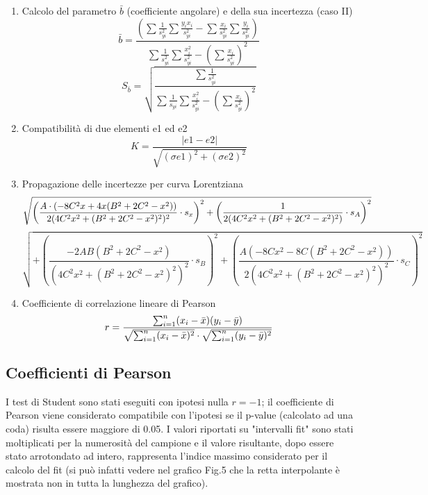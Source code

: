 \documentclass{article}
\begin{document}
\begin{enumerate}
\[
s_{\hat{a}} = s_y \sqrt{ \frac{ \sum_i x_i^2 }{ \Delta } }
\quad\quad
s_{\hat{b}} = s_y \sqrt{ \frac{N}{\Delta} }
\]
\item Calcolo del parametro $\bar{b}$ (coefficiente angolare) e della sua incertezza (caso II)
\[
\bar{b} = \frac{\left(\sum \frac{1}{s_{yi}^2} \sum \frac{y_{i}x_i}{s_{yi}^2} - \sum \frac{x_{i}}{s_{yi}^2} \sum \frac{y_{i}}{s_{yi}^2} \right)}
{\sum \frac{1}{s_{yi}^2} \sum \frac{x_i^2}{s_{yi}^2} - \left(\sum \frac{x_i}{s_{yi}^2} \right)^2} 
\]\[
S_{\bar{b}}=\sqrt{\frac{\sum\frac{1}{s_{yi}^2}}{\sum \frac{1}{s_{yi}}\sum \frac{x_i ^2}{s_{yi}^2}- (\sum \frac{x_i}{s_{yi}^2})^2}}\]
\item Compatibilità di due elementi e1 ed e2
\[
K=\frac{|e1-e2|}{\sqrt{(\sigma e1)^2+(\sigma e2)^2}}
\]
\item Propagazione delle incertezze per curva Lorentziana 
\[\small
\sqrt{
\left( \frac{A \cdot (-8C^2x + 4x(B^2 + 2C^2 - x^2))}{2(4C^2x^2 + (B^2 + 2C^2 - x^2)^2)^2} \cdot s_x \right)^2 
+ \left( \frac{1}{2(4C^2x^2 + (B^2 + 2C^2 - x^2)^2)} \cdot s_A \right)^2} \]
\[\sqrt{
+ \left( \frac{-2AB(B^2 + 2C^2 - x^2)}{(4C^2x^2 + (B^2 + 2C^2 - x^2)^2)^2} \cdot s_B \right)^2 
+ \left( \frac{A(-8Cx^2 - 8C(B^2 + 2C^2 - x^2))}{2(4C^2x^2 + (B^2 + 2C^2 - x^2)^2)^2} \cdot s_C \right)^2
}
\]
\item Coefficiente di correlazione lineare di Pearson
\[\small
r = \frac{\sum_{i=1}^{n} (x_i - \bar{x})(y_i - \bar{y})}
         {\sqrt{\sum_{i=1}^{n} (x_i - \bar{x})^2} \cdot \sqrt{\sum_{i=1}^{n} (y_i - \bar{y})^2}}
\]
\end{enumerate}

\newpage

\subsection{Coefficienti di Pearson}

I test di Student sono stati eseguiti con ipotesi nulla $r = -1$; il coefficiente di Pearson viene considerato compatibile con l'ipotesi se il p-value (calcolato ad una coda) risulta essere maggiore di 0.05. I valori riportati su "intervalli fit" sono stati moltiplicati per la numerosità del campione e il valore risultante, dopo essere stato arrotondato ad intero, rappresenta l'indice massimo considerato per il calcolo del fit (si può infatti vedere nel grafico Fig.5 che la retta interpolante è mostrata non in tutta la lunghezza del grafico). 
\end{document}
